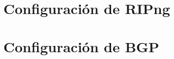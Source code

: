 \documentclass{article}
\begin{document}
\section{Configuración de RIPng}

\section{Configuración de BGP}

%
\end{document}
